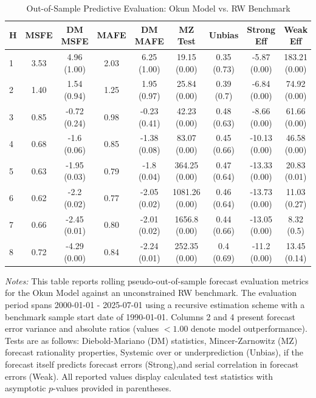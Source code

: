 \begin{table}[htbp]
\centering
\caption{Out-of-Sample Predictive Evaluation: Okun Model vs. RW Benchmark}
\label{tab:okun_model_evaluation}
\footnotesize
\begin{tabular}{l cccccccc}
\hline\hline
\rule{0pt}{3ex}
\textbf{H} & \textbf{MSFE} & \textbf{DM MSFE} & \textbf{MAFE} & \textbf{DM MAFE} & \textbf{MZ Test} & \textbf{Unbias} & \textbf{Strong Eff} & \textbf{Weak Eff} \\[0.5ex]
\hline
\rule{0pt}{2.5ex}
1 & 3.53 & 4.96 (1.00) & 2.03 & 6.25 (1.00) & 19.15 (0.00) & 0.35 (0.73) & -5.87 (0.00) & 183.21 (0.00) \\
2 & 1.40 & 1.54 (0.94) & 1.25 & 1.95 (0.97) & 25.84 (0.00) & 0.39 (0.7) & -6.84 (0.00) & 74.92 (0.00) \\
3 & 0.85 & -0.72 (0.24) & 0.98 & -0.23 (0.41) & 42.23 (0.00) & 0.48 (0.63) & -8.66 (0.00) & 61.66 (0.00) \\
4 & 0.68 & -1.6 (0.06) & 0.85 & -1.38 (0.08) & 83.07 (0.00) & 0.45 (0.66) & -10.13 (0.00) & 46.58 (0.00) \\
5 & 0.63 & -1.95 (0.03) & 0.79 & -1.8 (0.04) & 364.25 (0.00) & 0.47 (0.64) & -13.33 (0.00) & 20.83 (0.01) \\
6 & 0.62 & -2.2 (0.02) & 0.77 & -2.05 (0.02) & 1081.26 (0.00) & 0.46 (0.64) & -13.73 (0.00) & 11.03 (0.27) \\
7 & 0.66 & -2.45 (0.01) & 0.80 & -2.01 (0.02) & 1656.8 (0.00) & 0.44 (0.66) & -13.05 (0.00) & 8.32 (0.5) \\
8 & 0.72 & -4.29 (0.00) & 0.84 & -2.24 (0.01) & 252.35 (0.00) & 0.4 (0.69) & -11.2 (0.00) & 13.45 (0.14) \\
\hline\hline
\end{tabular}%
\par\smallskip
\parbox{\textwidth}{\scriptsize \textit{Notes:} This table reports rolling pseudo-out-of-sample forecast evaluation metrics for the Okun Model against an unconstrained RW benchmark. The evaluation period spans 2000-01-01 - 2025-07-01 using a recursive estimation scheme with a benchmark sample start date of 1990-01-01. Columns 2 and 4 present forecast error variance and absolute ratios (values $< 1.00$ denote model outperformance). Tests are as follows: Diebold-Mariano (DM) statistics, Mincer-Zarnowitz (MZ) forecast rationality properties, Systemic over or underprediction (Unbias), if the forecast itself predicts forecast errors (Strong),and serial correlation in forecast errors (Weak). All reported values display calculated test statistics with asymptotic $p$-values provided in parentheses.}
\end{table}
